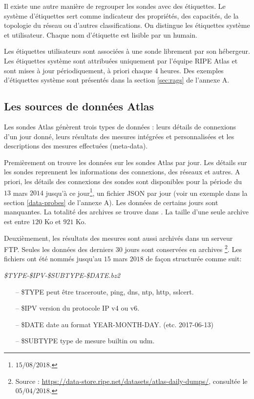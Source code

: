Il existe une autre manière de regrouper les sondes  avec des étiquettes.  Le système d'étiquettes sert comme indicateur des propriétés, des capacités, de la topologie du réseau ou d'autres classifications. On distingue les étiquettes système  et utilisateur. Chaque nom d'étiquette est lisible par un humain. 

Les étiquettes utilisateurs sont  associées à une sonde librement par son hébergeur. Les étiquettes système sont attribuées uniquement par l'équipe RIPE Atlas et sont mises à jour périodiquement, à priori chaque $4$ heures. Des exemples d'étiquettes système sont présentés dans la section \ref{sec:rags} de l'annexe A.


\subsection{Les sources de données Atlas} \label{subsec:sources-data}


Les sondes  Atlas génèrent trois types de données : leurs détails de connexions d'un jour donné, leurs résultats des mesures intégrées et personnalisées et les descriptions des mesures effectuées (meta-data). 

Premièrement on trouve les données sur les sondes  Atlas par jour. Les détails sur les sondes reprennent les informations des connexions, des réseaux et autres. A priori, les détails des connexions des sondes sont disponibles pour la période du  $13$ mars $2014$ jusqu'à ce jour\footnote{$15/08/2018$.}, un fichier JSON par jour (voir un exemple dans la section \ref{data-probes} de l'annexe A). Les données de certains jours sont manquantes.  La totalité des archives se trouve dans \cite{probes-data}. La taille d'une seule archive est entre $120 $ Ko et $921$ Ko. 

Deuxièmement, les résultats des mesures sont aussi archivés dans un serveur FTP. Seules les données des derniers $30$ jours  sont conservées en archives \footnote{Source : \url{https://data-store.ripe.net/datasets/atlas-daily-dumps/}, consultée le $05/04/2018$.}. Les fichiers ont été nommés jusqu'au  $ 15 $ mars $ 2018 $ de façon structurée comme suit: 

\begin{tcolorbox}
	\begin{center}
		\textit{\$TYPE-\$IPV-\$SUBTYPE-\$DATE.bz2}
	\end{center}
\end{tcolorbox}

\begin{itemize}
	\item[--] \$TYPE peut être {traceroute, ping, dns, ntp, http, sslcert}.
	\item[--] \$IPV version du protocole IP v4 ou v6.
	\item[--] \$DATE date au format  YEAR-MONTH-DAY. (etc. 2017-06-13)
	\item[--] \$SUBTYPE type de mesure builtin ou udm.
\end{itemize}


